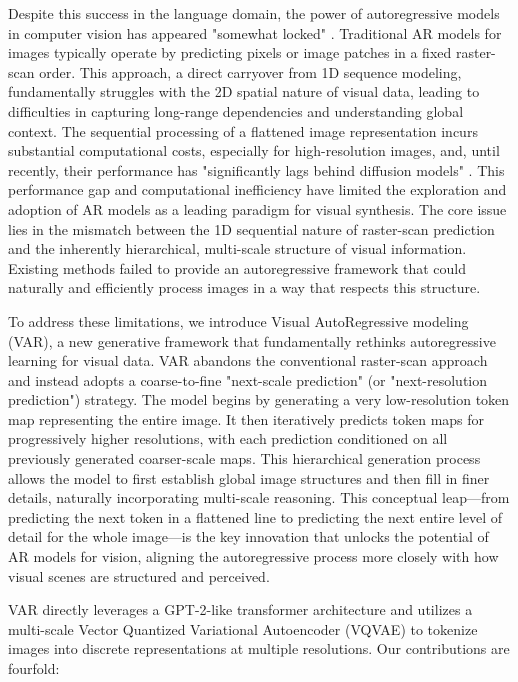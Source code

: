\documentclass{article}
\begin{document}
Despite this success in the language domain, the power of autoregressive models in computer vision has appeared "somewhat locked" \cite{esser2021taming}.
Traditional AR models for images typically operate by predicting pixels \cite{oord2016pixel} or image patches \cite{parmar2018image} in a fixed raster-scan order. This approach, a direct carryover from 1D sequence modeling, fundamentally struggles with the 2D spatial nature of visual data, leading to difficulties in capturing long-range dependencies and understanding global context. The sequential processing of a flattened image representation incurs substantial computational costs, especially for high-resolution images, and, until recently, their performance has "significantly lags behind diffusion models" \cite{dhariwal2021diffusion}.
This performance gap and computational inefficiency have limited the exploration and adoption of AR models as a leading paradigm for visual synthesis. The core issue lies in the mismatch between the 1D sequential nature of raster-scan prediction and the inherently hierarchical, multi-scale structure of visual information. Existing methods failed to provide an autoregressive framework that could naturally and efficiently process images in a way that respects this structure.

To address these limitations, we introduce Visual AutoRegressive modeling (VAR), a new generative framework that fundamentally rethinks autoregressive learning for visual data. VAR abandons the conventional raster-scan approach and instead adopts a coarse-to-fine "next-scale prediction" (or "next-resolution prediction") strategy. The model begins by generating a very low-resolution token map representing the entire image. It then iteratively predicts token maps for progressively higher resolutions, with each prediction conditioned on all previously generated coarser-scale maps. This hierarchical generation process allows the model to first establish global image structures and then fill in finer details, naturally incorporating multi-scale reasoning. This conceptual leap—from predicting the next token in a flattened line to predicting the next entire level of detail for the whole image—is the key innovation that unlocks the potential of AR models for vision, aligning the autoregressive process more closely with how visual scenes are structured and perceived.

VAR directly leverages a GPT-2-like transformer architecture \cite{radford2019language} and utilizes a multi-scale Vector Quantized Variational Autoencoder (VQVAE) \cite{van2017neural, razavi2019generating} to tokenize images into discrete representations at multiple resolutions. Our contributions are fourfold:
\end{document}
